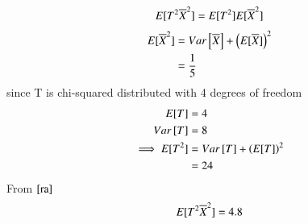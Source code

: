 \documentclass[journal,12pt,twocolumn]{IEEEtran}
\begin{document}
\begin{align}
    E[ T^2\overline{X}^2 ]=E[ T^2 ]E[ \overline{X}^2 ]\label{ra}
\end{align}
\begin{align}
    E[ \overline{X}^2 ]&=Var{}\left[\overline{X}\right]+\left(E[ \overline{X} ]\right)^2\\
    &=\frac{1}{5}
\end{align}
 since T is chi-squared distributed with 4 degrees of freedom
 \begin{align}
     E[ T ]&=4\\
     Var{}\left[T\right]&=8\\
     \implies E[ T^2 ]&=Var{}\left[T\right]+\left(E[ T ]\right)^2\\
    &=24
 \end{align}
 From $\eqref{ra}$
\begin{align}
    E[ T^2\overline{X}^2 ]=4.8
\end{align}
\end{document}
